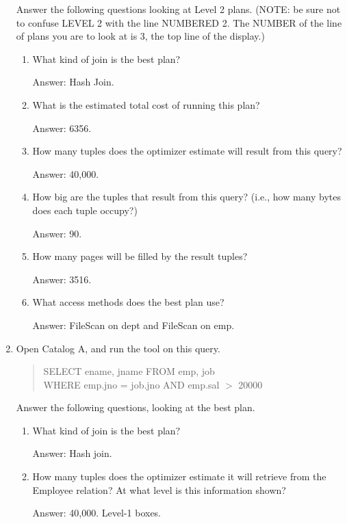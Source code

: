 \begin{enumerate}
Answer the following questions looking at Level 2 plans.  (NOTE: be sure
not to confuse LEVEL 2 with the line NUMBERED 2.  The NUMBER of the line
of plans you are to look at is 3, the top line of the display.)

\begin{enumerate}
\item
What kind of join is the best plan?

Answer: Hash Join.

\item
What is the estimated total cost of running this plan?

Answer: 6356.

\item
How many tuples does the optimizer estimate will result from this query?

Answer: 40,000.

\item
How big are the tuples that result from this query?  (i.e., how many
bytes does each tuple occupy?)

Answer: 90.

\item
How many pages will be filled by the result tuples?

Answer: 3516.

\item
What access methods does the best plan use?

Answer: FileScan on dept and FileScan on emp.
\end{enumerate}


\item
Open Catalog A, and run the tool on this query. 
\begin{quote}
        SELECT ename, jname FROM emp, job\\
        WHERE emp.jno = job.jno AND emp.sal $>$ 20000
\end{quote}

Answer the following questions, looking at the best plan.
\begin{enumerate}
\item
What kind of join is the best plan?

Answer: Hash join.

\item
How many tuples does the optimizer estimate it will retrieve from the
Employee relation?  At what level is this information shown?

Answer: 40,000. Level-1 boxes.


\end{enumerate}
\end{enumerate}
